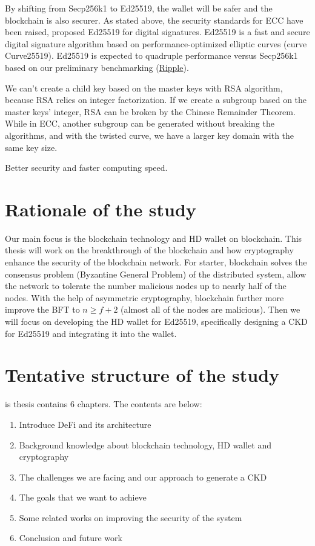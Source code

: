 By shifting from Secp256k1 to Ed25519, the wallet will be safer and the blockchain is also securer. As stated above, the security standards for ECC have been raised, proposed Ed25519 for digital signatures. Ed25519 is a fast and secure digital signature algorithm based on performance-optimized elliptic curves (curve Curve25519). Ed25519 is expected to quadruple performance versus Secp256k1 based on our preliminary benchmarking (\href{https://ripple.com/insights/curves-with-a-twist/}{Ripple}).

We can't create a child key based on the master keys with RSA algorithm, because RSA relies on integer factorization. If we create a subgroup based on the master keys' integer, RSA can be broken by the Chinese Remainder Theorem. While in ECC, another subgroup can be generated without breaking the algorithms, and with the twisted curve, we have a larger key domain with the same key size. 

Better security and faster computing speed.

\section{Rationale of the study}

Our main focus is the blockchain technology and HD wallet on blockchain. This thesis will work on the breakthrough of the blockchain and how cryptography enhance the security of the blockchain network. For starter, blockchain solves the consensus problem (Byzantine General Problem) of the distributed system, allow the network to tolerate the number malicious nodes up to nearly half of the nodes. With the help of asymmetric cryptography, blockchain further more improve the BFT to $n \geq f + 2$ (almost all of the nodes are malicious). Then we will focus on developing the HD wallet for Ed25519, specifically designing a CKD for Ed25519 and integrating it into the wallet.

\section{Tentative structure of the study}

is thesis contains 6 chapters. The contents are below:

\begin{enumerate}
  \item Introduce DeFi and its architecture
  \item Background knowledge about blockchain technology, HD wallet and cryptography
  \item The challenges we are facing and our approach to generate a CKD
  \item The goals that we want to achieve
  \item Some related works on improving the security of the system
  \item Conclusion and future work
\end{enumerate}

